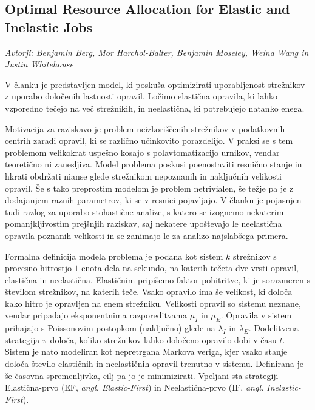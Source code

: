 \documentclass[a4paper,11pt]{article}
\begin{document}
\subsection{Optimal Resource Allocation for Elastic and Inelastic Jobs}

\begin{minipage}{0.35\textwidth}
    \centering
\end{minipage}\hfill
\begin{minipage}{0.65\textwidth}
    \textit{Avtorji: Benjamin Berg, Mor Harchol-Balter, Benjamin Moseley, Weina Wang in Justin Whitehouse}
    \\
\end{minipage}\hfill

\noindent
V članku je predstavljen model, ki poskuša optimizirati uporabljenost strežnikov z uporabo določenih lastnosti opravil. 
Ločimo elastična opravila, ki lahko vzporedno tečejo na več strežnikih, in neelastična, ki potrebujejo natanko enega.

Motivacija za raziskavo je problem neizkoriščenih strežnikov v podatkovnih centrih zaradi opravil, ki se različno učinkovito porazdelijo. 
V praksi se s tem problemom velikokrat uspešno kosajo s polavtomatizacijo urnikov, vendar teoretično ni zanesljiva. 
Model problema poskusi poenostaviti resnično stanje in hkrati obdržati nianse glede strežnikom nepoznanih in naključnih velikosti opravil. 
Še s tako preprostim modelom je problem netrivialen, še težje pa je z dodajanjem raznih parametrov, ki se v resnici pojavljajo. 
V članku je pojasnjen tudi razlog za uporabo stohastične analize, s katero se izognemo nekaterim pomanjkljivostim prejšnjih raziskav, saj nekatere upoštevajo le neelastična opravila poznanih velikosti in se zanimajo le za analizo najslabšega primera.

Formalna definicija modela problema je podana kot sistem $k$ strežnikov s procesno hitrostjo $1$ enota dela na sekundo, na katerih tečeta dve vrsti opravil, elastična in neelastična. 
Elastičnim pripišemo faktor pohitritve, ki je sorazmeren s številom strežnikov, na katerih teče. 
Vsako opravilo ima še velikost, ki določa kako hitro je opravljen na enem strežniku. 
Velikosti opravil so sistemu neznane, vendar pripadajo eksponentnima razporeditvama $\mu_I$ in $\mu_E$. 
Opravila v sistem prihajajo s Poissonovim postopkom (naključno) glede na $\lambda_I$ in $\lambda_E$. 
Dodelitvena strategija $\pi$ določa, koliko strežnikov lahko določeno opravilo dobi v času $t$. 
Sistem je nato modeliran kot nepretrgana Markova veriga, kjer vsako stanje določa število elastičnih in neelastičnih opravil trenutno v sistemu. 
Definirana je še časovna spremenljivka, cilj pa jo je minimizirati. Vpeljani sta strategiji Elastična-prvo (EF, \textit{angl. Elastic-First}) in Neelastična-prvo (IF, \textit{angl. Inelastic-First}).
  
\end{document}
